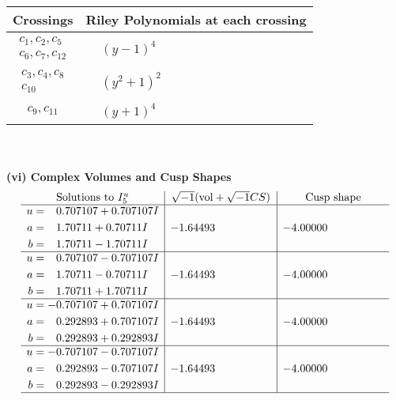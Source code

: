 \documentclass[1p]{elsarticle_modified}
\theoremstyle{definition}
\newcommand{\I}{\sqrt{-1}}
\begin{document}
\begin{tabular}{m{50pt}|m{274pt}}
Crossings & \hspace{64pt}Riley Polynomials at each crossing \\
\hline $$\begin{aligned}c_{1},c_{2},c_{5}\\c_{6},c_{7},c_{12}\end{aligned}$$&$\begin{aligned}
&(y-1)^4
\end{aligned}$\\
\hline $$\begin{aligned}c_{3},c_{4},c_{8}\\c_{10}\end{aligned}$$&$\begin{aligned}
&(y^2+1)^2
\end{aligned}$\\
\hline $$\begin{aligned}c_{9},c_{11}\end{aligned}$$&$\begin{aligned}
&(y+1)^4
\end{aligned}$\\
\hline
\end{tabular}\\~\\
\newpage\flushleft \textbf{(vi) Complex Volumes and Cusp Shapes}
$$\begin{array}{c|c|c}  
\text{Solutions to }I^u_{5}& \I (\text{vol} + \sqrt{-1}CS) & \text{Cusp shape}\\
 \hline 
\begin{aligned}
u &= \phantom{-}0.707107 + 0.707107 I \\
a &= \phantom{-}1.70711 + 0.70711 I \\
b &= \phantom{-}1.70711 - 1.70711 I\end{aligned}
 & -1.64493\phantom{ +0.000000I} & -4.00000\phantom{ +0.000000I} \\ \hline\begin{aligned}
u &= \phantom{-}0.707107 - 0.707107 I \\
a &= \phantom{-}1.70711 - 0.70711 I \\
b &= \phantom{-}1.70711 + 1.70711 I\end{aligned}
 & -1.64493\phantom{ +0.000000I} & -4.00000\phantom{ +0.000000I} \\ \hline\begin{aligned}
u &= -0.707107 + 0.707107 I \\
a &= \phantom{-}0.292893 + 0.707107 I \\
b &= \phantom{-}0.292893 + 0.292893 I\end{aligned}
 & -1.64493\phantom{ +0.000000I} & -4.00000\phantom{ +0.000000I} \\ \hline\begin{aligned}
u &= -0.707107 - 0.707107 I \\
a &= \phantom{-}0.292893 - 0.707107 I \\
b &= \phantom{-}0.292893 - 0.292893 I\end{aligned}
 & -1.64493\phantom{ +0.000000I} & -4.00000\phantom{ +0.000000I}\\
 \hline 
 \end{array}$$\newpage\newpage\renewcommand{\arraystretch}{1}
\end{document}
